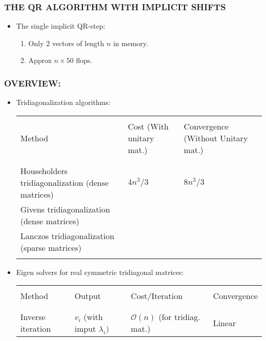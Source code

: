 \documentclass[a4paper,8pt]{beamer} %
\begin{document}
\begin{frame}
	\frametitle{THE QR ALGORITHM WITH IMPLICIT SHIFTS}
	\begin{itemize}
		\item The single implicit QR-step:
			\begin{enumerate}
				\item Only 2 vectors of length $n$ in memory.
				\item Approx $n\times 50$ flops.
			\end{enumerate}
		\lst
	\end{itemize}
\end{frame}%
\begin{frame} %
\frametitle{OVERVIEW:}
		\begin{itemize}
			\item Tridiagonalization algorithms:
				\begin{table}
					\begin{Tiny}
						\centering
						\begin{tabular}{lll}
							\hline
							\hline
							\\
							Method & Cost (With unitary mat.) & Convergence (Without Unitary mat.) \\
							\\
							\hline
							\\
							Householders tridiagonalization (dense matrices) 	& $4n^3/3 $ & $ 8n^3/3 $ \\
							Givens tridiagonalization (dense matrices)			& %
							 &  \\
							Lanczos tridiagonalization (sparse matrices)		& & \\
							\\
							\hline
							\hline
						\end{tabular}
					\end{Tiny}
				\end{table}
			\item Eigen solvers for real symmetric tridiagonal matrices:
				\begin{table}
					\begin{Tiny}
						\centering
						\begin{tabular}{llll}
							\hline
							\hline
							\\
							Method & Output & Cost/Iteration & Convergence \\
							\\
							\hline
							\\
							Inverse iteration 			& $v_i$ (with imput $\lambda_{i})$ & $\mathcal O(n)$ (for tridiag. mat.) & Linear\\ 

\end{tabular}
\end{Tiny}
\end{table}
\end{itemize}
\end{frame}
\end{document}
